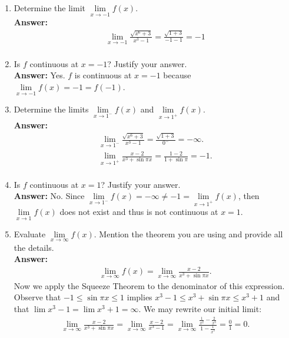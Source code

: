 \documentclass{article}
\begin{document}
\begin{enumerate}
\begin{enumerate}
            \item Determine the limit $\lim\limits_{x \to -1} f(x)$.\\
            \textbf{Answer: }\\
                \begin{align*}
                    \lim\limits_{x \to -1} \frac{\sqrt{x^6+3}}{x^3-1} = \frac{\sqrt{1+3}}{-1-1} = -1 \\
                \end{align*}
                
            \item Is $f$ continuous at $x=-1$? Justify your answer.\\
            \textbf{Answer: }Yes. $f$ is continuous at $x=-1$ because $\lim\limits_{x \to -1} f(x) = -1 = f(-1)$.\\
            
            \item Determine the limits $\lim\limits_{x \to 1^-} f(x)$ and $\lim\limits_{x \to 1^+} f(x)$.\\
            \textbf{Answer: }
                \begin{align*}
                    \lim\limits_{x \to 1^-} \frac{\sqrt{x^6+3}}{x^3-1} = \frac{\sqrt{1+3}}{0^-} = -\infty.\\
                    \lim\limits_{x \to 1^+} \frac{x-2}{x^3+\sin{\pi x}} = \frac{1-2}{1+\sin{\pi}} = -1.\\
                \end{align*}
                
            \item Is $f$ continuous at $x=1$? Justify your answer.\\
            \textbf{Answer: }No. Since $\lim\limits_{x \to 1^-}f(x) = -\infty \neq -1 = \lim\limits_{x \to 1^+} f(x)$, then $\lim \limits_{x \to 1} f(x)$ does not exist and thus is not continuous at $x = 1$.\\
            
            \item Evaluate $\lim\limits_{x \to \infty} f(x)$. Mention the theorem you are using and provide all the details.\\
            \textbf{Answer: }
                \begin{align*}
                    \lim\limits_{x \to \infty} f(x) = \lim\limits_{x \to \infty} \frac{x-2}{x^3+\sin{\pi x}}.
                \end{align*}
            Now we apply the Squeeze Theorem to the denominator of this expression. Observe that $-1 \leq \sin{\pi x} \leq 1$ implies $x^3-1 \leq x^3+\sin{\pi x} \leq x^3+1$ and that $\lim\limits x^3-1 = \lim\limits x^3+1 = \infty$. We may rewrite our initial limit:
                \begin{align*}
                    \lim\limits_{x \to \infty} \frac{x-2}{x^3+\sin{\pi x}} = \lim\limits_{x \to \infty} \frac{x-2}{x^3-1} = \lim\limits_{x \to \infty} \frac{\frac{1}{x^2}-\frac{2}{x^3}}{1-\frac{1}{x^3}} = \frac{0}{1} = 0. 
                \end{align*}
        \end{enumerate}
        

\end{enumerate}
\end{document}
